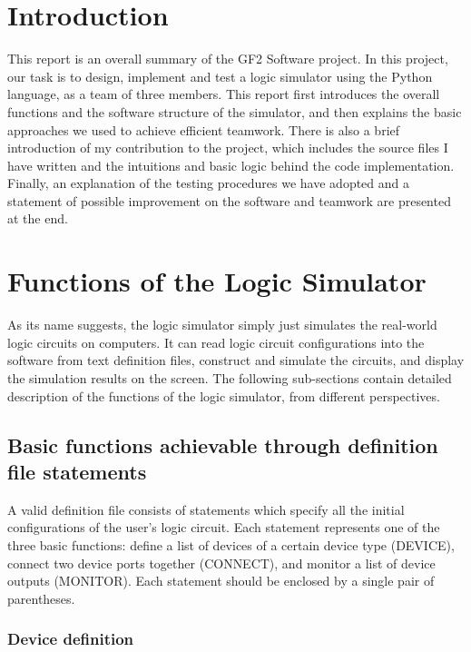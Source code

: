 \documentclass[10pt,a4paper]{article}
\author{Yuchen Zhou}
\date{\today}
\title{}
\begin{document}


\section{Introduction}
\label{sec:orgf2a6e99}

This report is an overall summary of the GF2 Software project. In this
project, our task is to design, implement and test a logic simulator
using the Python language, as a team of three members. This report
first introduces the overall functions and the software structure of
the simulator, and then explains the basic approaches we used to
achieve efficient teamwork. There is also a brief introduction of my
contribution to the project, which includes the source files I have
written and the intuitions and basic logic behind the code
implementation. Finally, an explanation of the testing procedures we
have adopted and a statement of possible improvement on the software
and teamwork are presented at the end.

\section{Functions of the Logic Simulator}
\label{sec:org5f350c5}

As its name suggests, the logic simulator simply just simulates the
real-world logic circuits on computers. It can read logic circuit
configurations into the software from text definition files, construct
and simulate the circuits, and display the simulation results on the
screen. The following sub-sections contain detailed description of the
functions of the logic simulator, from different perspectives.

\subsection{Basic functions achievable through definition file statements}
\label{sec:org7d9959c}
\label{org6f9e7f7}

A valid definition file consists of statements which specify all the
initial configurations of the user's logic circuit. Each statement
represents one of the three basic functions: define a list of devices
of a certain device type (DEVICE), connect two device ports together
(CONNECT), and monitor a list of device outputs (MONITOR). Each
statement should be enclosed by a single pair of parentheses.

\subsubsection{Device definition}
\label{sec:org6afdebf}
\end{document}
